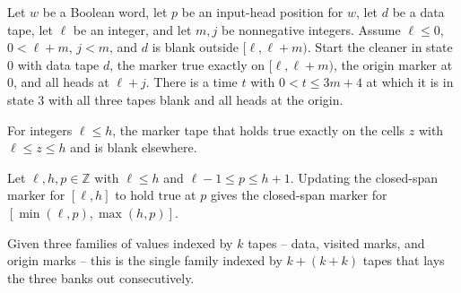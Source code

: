 \begin{lemma}
\label{Turing.FinTM.emCall_clear_run}
\leanok
{}
Let $w$ be a Boolean word, let $p$ be an input-head position for $w$, let $d$ be a data
tape, let $\ell$ be an integer, and let $m,j$ be nonnegative integers. Assume $\ell\le
0$, $0<\ell+m$, $j<m$, and $d$ is blank outside $[\ell,\ell+m)$. Start the cleaner in
state $0$ with data tape $d$, the marker true exactly on $[\ell,\ell+m)$, the origin
marker at $0$, and all heads at $\ell+j$. There is a time $t$ with $0<t\le 3m+4$ at
which it is in state $3$ with all three tapes blank and all heads at the origin.
\end{lemma}

\begin{definition}
\label{Turing.FinTM.emCallSpan}
\leanok
For integers $\ell \le h$, the marker tape that holds $\mathrm{true}$ exactly on the
cells $z$ with $\ell \le z \le h$ and is blank elsewhere.
\end{definition}

\begin{lemma}
\label{Turing.FinTM.emCall_span_extend}
\leanok
{}
Let $\ell,h,p\in\mathbb{Z}$ with $\ell\le h$ and $\ell-1\le p\le h+1$. Updating the
closed-span marker for $[\ell,h]$ to hold $\mathrm{true}$ at $p$ gives the closed-span
marker for $[\min(\ell,p),\max(h,p)]$.
\end{lemma}

\begin{definition}
\label{Turing.FinTM.emCallSlots}
\leanok
Given three families of values indexed by $k$ tapes -- data, visited marks, and origin
marks -- this is the single family indexed by $k + (k + k)$ tapes that lays the three
banks out consecutively.
\end{definition}

